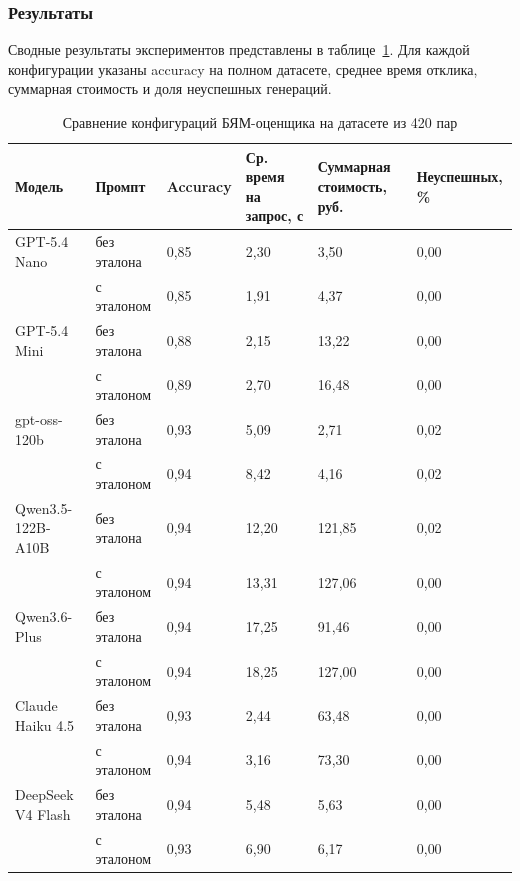 \subsubsection{Результаты}
Сводные результаты экспериментов представлены в таблице~\ref{tab:eval_results}.
Для каждой конфигурации указаны accuracy на полном датасете, среднее
время отклика, суммарная стоимость и доля неуспешных генераций.
\begin{table}[h!]
\caption{Сравнение конфигураций БЯМ-оценщика на датасете из 420 пар}
\label{tab:eval_results}
\centering
\small
\begin{tabular}{|p{3.2cm}|p{2.0cm}|p{1.6cm}|p{1.8cm}|p{1.9cm}|p{2.3cm}|}
\hline
\textbf{Модель} & \textbf{Промпт} &
\textbf{Accuracy} & \textbf{Ср. время на запрос, с} & \textbf{Суммарная стоимость, руб.} & \textbf{Неуспешных, \%} \\
\hline
GPT-5.4 Nano       & без эталона & 0{,}85 & 2{,}30  & 3{,}50   & 0{,}00 \\
\hline
                   & с эталоном & 0{,}85 & 1{,}91  & 4{,}37   & 0{,}00 \\
\hline
GPT-5.4 Mini       & без эталона & 0{,}88 & 2{,}15  & 13{,}22  & 0{,}00 \\
\hline
                   & с эталоном & 0{,}89 & 2{,}70  & 16{,}48  & 0{,}00 \\
\hline
gpt-oss-120b       & без эталона & 0{,}93 & 5{,}09  & 2{,}71   & 0{,}02 \\
\hline
                  & с эталоном & 0{,}94 & 8{,}42  & 4{,}16   & 0{,}02 \\
\hline
Qwen3.5-122B-A10B  & без эталона & 0{,}94 & 12{,}20 & 121{,}85 & 0{,}02 \\
\hline
                  & с эталоном & 0{,}94 & 13{,}31 & 127{,}06 & 0{,}00 \\
\hline
Qwen3.6-Plus       & без эталона & 0{,}94 & 17{,}25 & 91{,}46 & 0{,}00 \\
\hline
                  & с эталоном & 0{,}94 & 18{,}25 & 127{,}00 & 0{,}00 \\
\hline
Claude Haiku 4.5   & без эталона & 0{,}93 & 2{,}44  & 63{,}48 & 0{,}00 \\
\hline
                  & с эталоном & 0{,}94 & 3{,}16  & 73{,}30 & 0{,}00 \\
\hline
DeepSeek V4 Flash & без эталона & 0{,}94 & 5{,}48  & 5{,}63 & 0{,}00 \\
\hline
                  & с эталоном & 0{,}93 & 6{,}90  & 6{,}17 & 0{,}00 \\
\hline
\end{tabular}
\end{table}

